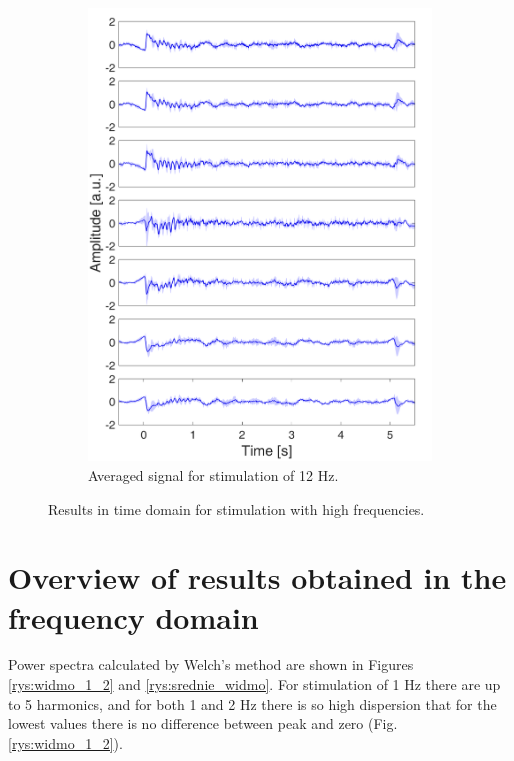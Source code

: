 \documentclass{pracalicmgr}
\begin{document}
\begin{figure}[H]
\begin{subfigure}{.5\textwidth}
	\includegraphics[width=1.\linewidth]{srednie_12Hz_5s.png}
	\caption{Averaged signal for stimulation of 12 Hz.}
	\label{rys:srednie_12Hz}
	\end{subfigure}
	\caption{Results in time domain for stimulation with high frequencies.}
	\label{rys:srednia_czas}
		
	\end{figure}
	
    \section{Overview of results obtained in the frequency domain}
    \label{sec:freq}
    
    Power spectra calculated by Welch's method are shown in Figures \ref{rys:widmo_1_2} and \ref{rys:srednie_widmo}. For stimulation of 1 Hz there are up to 5 harmonics, and for both 1 and 2 Hz there is so high dispersion that for the lowest values there is no difference between peak and zero (Fig. \ref{rys:widmo_1_2}).     
    
\end{document}
